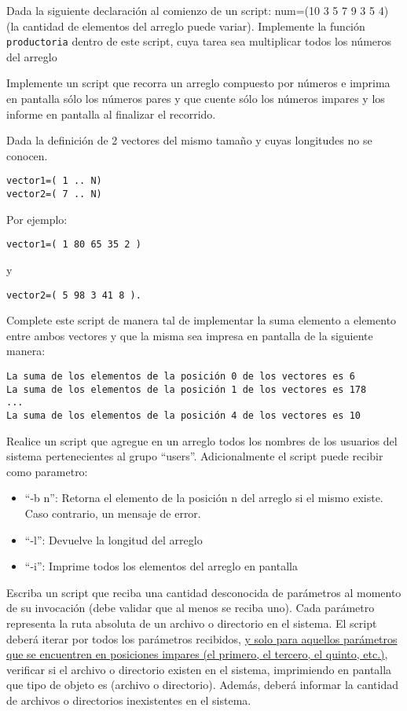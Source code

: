 \begin{questions}
\item Dada la siguiente declaración al comienzo de un script: num=(10 3 5 7 9 3 5 4) (la cantidad de elementos del arreglo puede variar). Implemente la función \texttt{productoria} dentro de este script, cuya tarea sea multiplicar todos los números del arreglo

\item Implemente un script que recorra un arreglo compuesto por números e imprima en pantalla sólo los números pares y que cuente sólo los números impares y los informe en pantalla al finalizar el recorrido.

\item Dada la definición de 2 vectores del mismo tamaño y cuyas longitudes no se conocen.
\begin{verbatim}
vector1=( 1 .. N)
vector2=( 7 .. N)
\end{verbatim}

Por ejemplo:
\begin{verbatim}
vector1=( 1 80 65 35 2 ) 
\end{verbatim}
y 
\begin{verbatim}
vector2=( 5 98 3 41 8 ).
\end{verbatim}

Complete este script de manera tal de implementar la suma elemento a elemento entre ambos vectores y que la misma sea impresa en pantalla de la siguiente manera:
\begin{verbatim}
La suma de los elementos de la posición 0 de los vectores es 6
La suma de los elementos de la posición 1 de los vectores es 178
...
La suma de los elementos de la posición 4 de los vectores es 10
\end{verbatim}

\item Realice un script que agregue en un arreglo todos los nombres de los usuarios del
sistema pertenecientes al grupo “users”. Adicionalmente el script puede recibir como
parametro:
\begin{itemize}
\item ``-b n'': Retorna el elemento de la posición n del arreglo si el mismo existe. Caso contrario, un mensaje de error.
\item ``-l'': Devuelve la longitud del arreglo
\item ``-i'': Imprime todos los elementos del arreglo en pantalla
\end{itemize}

\item Escriba un script que reciba una cantidad desconocida de parámetros al momento de su invocación (debe validar que al menos se reciba uno). Cada parámetro representa la ruta absoluta de un archivo o directorio en el sistema. El script deberá iterar por todos los parámetros recibidos, \underline{y solo para aquellos parámetros que se encuentren en posiciones impares (el primero, el tercero, el quinto, etc.)}, verificar si el archivo o directorio existen en el sistema, imprimiendo en pantalla que tipo de objeto es (archivo o directorio). Además, deberá informar la cantidad de archivos o directorios inexistentes en el sistema.


\end{questions}
